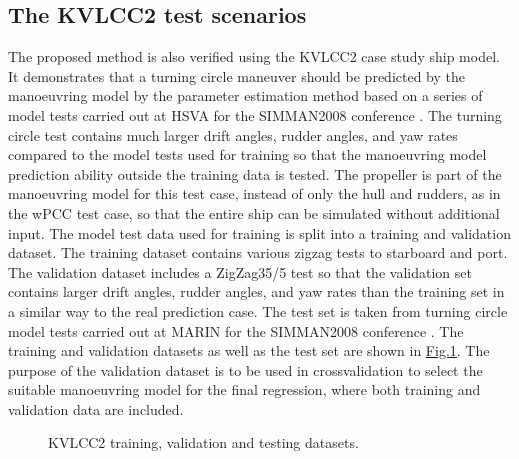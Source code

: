 \documentclass[review]{elsarticle}
\begin{document}
\subsection{The KVLCC2 test scenarios}
\label{\detokenize{05.01_case_studies:the-kvlcc2-test-scenarios}}
\sphinxAtStartPar
The proposed method is also verified using the KVLCC2 case study ship model. It demonstrates that a turning circle maneuver should be predicted by the manoeuvring model by the parameter estimation method based on a series of model tests carried out at HSVA for the SIMMAN2008 conference \cite{stern_experience_2011}. The turning circle test contains much larger drift angles, rudder angles, and yaw rates compared to the model tests used for training so that
the manoeuvring model prediction ability outside the training data is tested.
The propeller is part of the manoeuvring model for this test case, instead of only the hull and rudders, as in the wPCC test case, so that the entire ship can be simulated without additional input.
The model test data used for training is split into a training and validation dataset. The training dataset contains various zigzag tests to starboard and port. The validation dataset includes a ZigZag35/5 test so that the validation set contains larger drift angles, rudder angles, and yaw rates than the training set in a similar way to the real prediction case. The test set is taken from turning circle model tests carried out at MARIN for the SIMMAN2008 conference \cite{stern_experience_2011}. The training and validation datasets as well as the test set are shown in \hyperref[\detokenize{05.01_case_studies:fig-kvlcc2-traintest}]{Fig.\@ \ref{\detokenize{05.01_case_studies:fig-kvlcc2-traintest}}}.
The purpose of the validation dataset is to be used in cross\sphinxhyphen{}validation to select the suitable manoeuvring model for the final regression, where both training and validation data are included.

\begin{figure}[H]
\centering
\capstart

\noindent{}
\caption{KVLCC2 training, validation and testing datasets.}\label{\detokenize{05.01_case_studies:fig-kvlcc2-traintest}}\end{figure}
\end{document}

